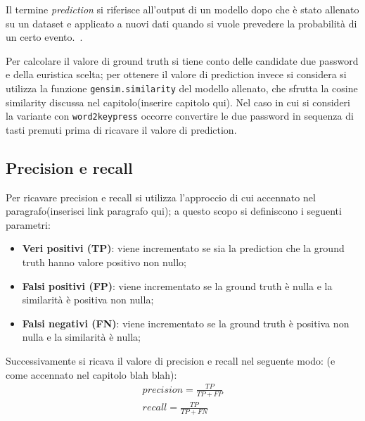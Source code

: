 Il termine \emph{prediction} si riferisce all'output di un modello dopo che è stato allenato su un dataset e applicato a nuovi dati quando si vuole prevedere la probabilità di un certo evento.~\cite{prediction}.

Per calcolare il valore di ground truth si tiene conto delle candidate due password e della euristica scelta; per ottenere il valore di prediction invece si considera si utilizza la funzione \texttt{gensim.similarity} del modello allenato, che sfrutta la cosine similarity discussa nel capitolo(inserire capitolo qui).
Nel caso in cui si consideri la variante con \texttt{word2keypress} occorre convertire le due password in sequenza di tasti premuti prima di ricavare il valore di prediction.
\subsection{Precision e recall}
Per ricavare precision e recall si utilizza l'approccio di cui accennato nel paragrafo(inserisci link paragrafo qui); a questo scopo si definiscono i seguenti parametri:
\begin{itemize}
    \item \textbf{Veri positivi (TP)}: viene incrementato se sia la prediction che la ground truth hanno valore positivo non nullo;
    \item \textbf{Falsi positivi (FP)}: viene incrementato se la ground truth è nulla e la similarità è positiva non nulla;
    \item \textbf{Falsi negativi (FN)}: viene incrementato se la ground truth è positiva non nulla e la similarità è nulla;
\end{itemize}
Successivamente si ricava il valore di precision e recall nel seguente modo: (e come accennato nel capitolo blah blah):
\begin{gather*}
precision = \frac{TP}{TP + FP}
\\
recall = \frac{TP}{TP + FN}
\end{gather*}

